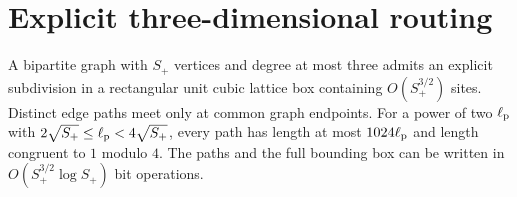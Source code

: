\section{Explicit three-dimensional routing}
\label{d:app:routing}

\begin{lemma}
\label{d:lem:cubic-routing}
A bipartite graph with $S_+$ vertices and degree at most three admits an
explicit subdivision in a rectangular unit cubic lattice box containing
$O(S_+^{3/2})$ sites. Distinct edge paths meet only at common graph
endpoints. For a power of two $\ell_{\rm p}$ with
$2\sqrt{S_+}\le\ell_{\rm p}<4\sqrt{S_+}$, every path has length at most $1024\ell_{\rm p}$
and length congruent to $1$ modulo $4$. The paths and the full bounding
box can be written in $O(S_+^{3/2}\log S_+)$ bit operations.
\end{lemma}

